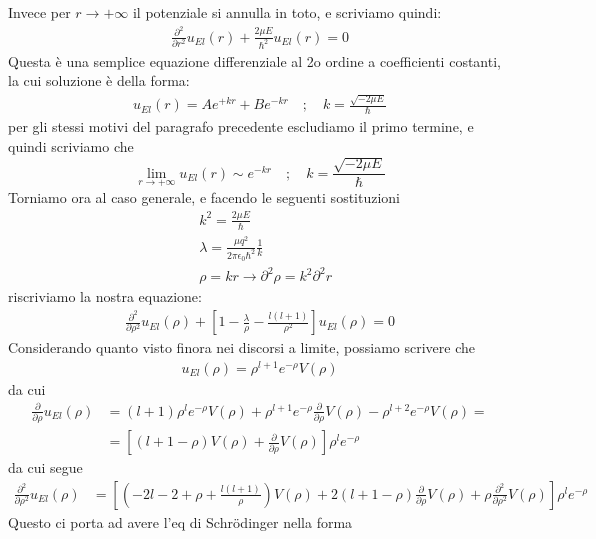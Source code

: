 Invece per $r \rightarrow +\infty$ il potenziale si annulla in toto, e scriviamo quindi:
\begin{align}
\frac{\partial^2}{\partial r^2} u_{E l}(r) + \frac{2 \mu E}{\hbar^2} u_{E l}(r) =0
\end{align}
Questa è una semplice equazione differenziale al 2o ordine a coefficienti costanti, la cui soluzione è della forma:
\begin{align}
u_{E l}(r) = Ae^{+kr} + Be^{-kr} \quad ; \quad k= \frac{\sqrt{-2 \mu E}}{\hbar}
\end{align}
per gli stessi motivi del paragrafo precedente escludiamo il primo termine, e quindi scriviamo che 
\begin{equation}
\lim_{r \rightarrow +\infty} u_{E l}(r)  \sim e^{-kr} \quad ; \quad k= \frac{\sqrt{-2 \mu E}}{\hbar}
\end{equation}
Torniamo ora al caso generale, e facendo le seguenti sostituzioni
\begin{align}
{}&k^2 = \frac{2 \mu E}{\hbar} \\
&\lambda = \frac{\mu q^2}{2 \pi \epsilon_0 \hbar^2}\frac{1}{k} \\
&\rho = kr \rightarrow \partial^2 \rho = k^2 \partial^2r
\end{align}
riscriviamo la nostra equazione:
\begin{align}
\frac{\partial^2}{\partial \rho^2} u_{E l}(\rho) + \left[  1 - \frac{\lambda}{\rho} - \frac{l(l+1)}{\rho^2} \right]u_{E l}(\rho)=0
\end{align}
Considerando quanto visto finora nei discorsi a limite, possiamo scrivere che
\begin{align}
 u_{E l}(\rho) = \rho^{l+1} e^{-\rho}V(\rho)
\end{align}
da cui
\begin{align}
\frac{\partial}{\partial \rho} u_{E l}(\rho) {}&= (l+1) \rho^l e^{-\rho}V(\rho) + \rho^{l+1}e^{-\rho}\frac{\partial}{\partial \rho} V(\rho) - \rho^{l+2} e^{-\rho}V(\rho)= \nonumber \\
&= \left[ (l+1-\rho)V(\rho) + \frac{\partial}{\partial \rho} V(\rho) \right] \rho^l e^{-\rho}
\end{align}
da cui segue
\begin{align}
\frac{\partial^2}{\partial \rho^2} u_{E l}(\rho) {}&= \left[
\left(-2l-2 + \rho + \frac{l(l+1)}{\rho} \right)V(\rho) + 2(l+1-\rho)\frac{\partial }{\partial \rho}V(\rho) + \rho \frac{\partial^2}{\partial \rho^2}V(\rho)
\right] \rho^l e^{-\rho}
\end{align} 
Questo ci porta ad avere l'eq di Schrödinger nella forma
